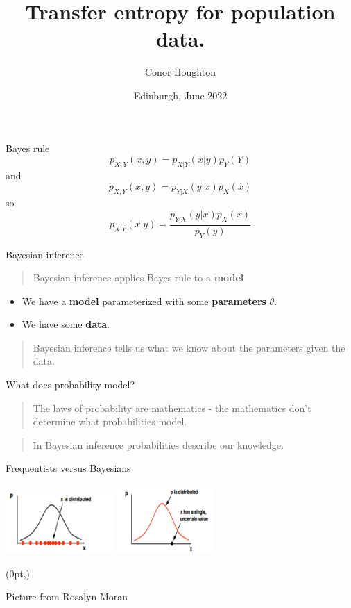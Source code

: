 \documentclass{beamer}
\title[Transfer entropy for population data.]{Transfer entropy for population data.}
\author{Conor Houghton}
\institute{U Bristol}
\date{Edinburgh, June 2022}
\newcommand\FrameText[1]{%
  \begin{textblock*}{\paperwidth}(0pt,\textheight)
    \raggedright #1\hspace{.5em}
  \end{textblock*}}
\newcommand{\crish}{\color{reddish}}
\newcommand{\cbla}{\color{black}}
\newcommand{\sm}{\color{reddish}$}
\newcommand{\fm}{$\color{black}{}}
\begin{document}
\maketitle

\begin{frame}{Bayes rule}
  \crish
  $$p_{X,Y}(x,y)=p_{X|Y}(x|y)p_Y(Y)$$
  \cbla
  and
  \crish
  $$p_{X,Y}(x,y)=p_{Y|X}(y|x)p_X(x)$$
  \cbla
  so
  \crish
  $$p_{X|Y}(x|y)=\frac{p_{Y|X}(y|x)p_X(x)}{p_Y(y)}$$
  \cbla
  \end{frame}

\begin{frame}{Bayesian inference}
  \begin{quote}Bayesian inference applies Bayes rule to a \textbf{model}\end{quote}
  \begin{itemize}
  \item We have a \textbf{model} parameterized with some \textbf{parameters} \sm \theta\fm{}.
  \item We have some \textbf{data}.
  \end{itemize}
  \begin{quote} Bayesian inference tells us what we know about the parameters given the data.\end{quote}
\end{frame}



\begin{frame}{What does probability model?}
  \begin{quote}
    The laws of probability are mathematics - the mathematics don't determine what probabilities model.
  \end{quote}
    \begin{quote}
    In Bayesian inference probabilities describe our knowledge.
  \end{quote}
\end{frame}

\begin{frame}{Frequentists versus Bayesians}
  \begin{center}
\includegraphics[width=4.125cm]{fig_freq.png}
\includegraphics[width=3.75cm]{fig_bayes.png}
\end{center}
  \FrameText{\tiny{Picture from Rosalyn Moran}}  
\end{frame}
\end{document}
